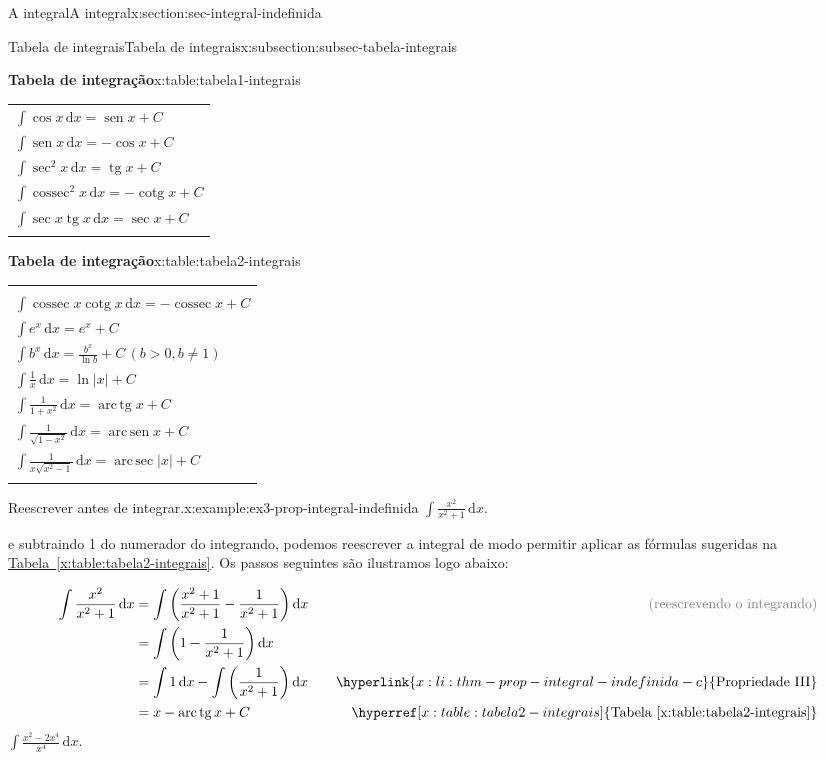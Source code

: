 \documentclass[oneside,10pt,]{article}
\newcommand{\tabularfont}{\relax}
\newcommand{\xreffont}{\relax}
\numberwithin{equation}{section}
\newcommand{\hrulethin}  {\noalign{\hrule height 0.04em}}
\newcommand{\hrulemedium}{\noalign{\hrule height 0.07em}}
\newcommand{\hrulethick} {\noalign{\hrule height 0.11em}}
\newcommand{\dd}{\mathrm{d}}
\newcommand{\integral}[2]{\displaystyle\int {#1}\,\dd {#2}}
\DeclareMathOperator{\arcsec}{arc \,sec}
\DeclareMathOperator{\sin}{sen}
\DeclareMathOperator{\arcsin}{arc \,sen}
\DeclareMathOperator{\csc}{cossec}
\DeclareMathOperator{\tan}{tg}
\DeclareMathOperator{\arctan}{arc\,tg}
\DeclareMathOperator{\cot}{cotg}
\newcommand{\amp}{&}
\begin{document}
\begin{sectionptx}{A integral}{}{A integral}{}{}{x:section:sec-integral-indefinida}
\begin{subsectionptx}{Tabela de integrais}{}{Tabela de integrais}{}{}{x:subsection:subsec-tabela-integrais}
\begin{tableptx}{\textbf{Tabela de integração}}{x:table:tabela1-integrais}{}
{\begin{tabular}{l}
\(\integral{\cos{x}}{x}=\sin{x} + C\)\tabularnewline[0pt]
\(\integral{\sin{x}}{x}=-\cos{x} + C\)\tabularnewline[0pt]
\(\integral{\sec^2{x}}{x}=\tan{x} + C\)\tabularnewline[0pt]
\(\integral{\csc^2{x}}{x}=-\cot{x} + C\)\tabularnewline[0pt]
\(\integral{\sec{x}\tan{x}}{x}=\sec{x} + C\)\tabularnewline\hrulemedium
\end{tabular}
}%
\end{tableptx}%
\begin{tableptx}{\textbf{Tabela de integração}}{x:table:tabela2-integrais}{}%
\centering
{\tabularfont%
\begin{tabular}{l}\hrulethick
\multicolumn{1}{c}{Fórmula}\tabularnewline\hrulethin
\(\integral{\csc{x}\cot{x}}{x}=-\csc{x} + C\)\tabularnewline[0pt]
\(\integral{e^x}{x} = e^x + C\)\tabularnewline[0pt]
\(\integral{b^x}{x}= \frac{b^x}{\ln{b}} + C\, (b>0, b\neq 1)\)\tabularnewline[0pt]
\(\integral{\frac{1}{x}}{x}=\ln{|x|} + C\)\tabularnewline[0pt]
\(\integral{\frac{1}{1+x^2}}{x}=\arctan{x} + C\)\tabularnewline[0pt]
\(\integral{\frac{1}{\sqrt{1-x^2}}}{x}=\arcsin{x} + C\)\tabularnewline[0pt]
\(\integral{\frac{1}{x\sqrt{x^2-1}}}{x}=\arcsec{|x|} + C\)\tabularnewline\hrulemedium
\end{tabular}
}%
\end{tableptx}%
\begin{example}{Reescrever antes de integrar.}{x:example:ex3-prop-integral-indefinida}%
\(\integral{\frac{x^2}{x^2+1}}{x}\).%
\par\smallskip%
\noindentSomando e subtraindo 1 do numerador do integrando, podemos reescrever a integral de modo permitir aplicar as fórmulas sugeridas na \hyperref[x:table:tabela2-integrais]{Tabela~{\xreffont\ref{x:table:tabela2-integrais}}}. Os passos seguintes são ilustramos logo abaixo:%
\par
%
\begin{align*}
\integral{\frac{x^2}{x^2+1}}{x} \amp = \integral{\left(\frac{x^2+1}{x^2+1}-\frac{1}{x^2+1}\right)}{x} \amp \color{gray}{\text{(reescrevendo o integrando)}}\\
\amp =\integral{\left(1-\frac{1}{x^2+1}\right)}{x} \\
\amp = \integral{1}{x} - \integral{\left(\frac{1}{x^2+1}\right)}{x} \quad \amp \hyperlink{x:li:thm-prop-integral-indefinida-c}{\text{Propriedade III}}\\
\amp = x - \arctan{x} + C \quad  \quad \amp \hyperref[x:table:tabela2-integrais]{\text{Tabela {\xreffont\ref{x:table:tabela2-integrais}}}}
\end{align*}
%
 \(\integral{\frac{x^2- 2x^4}{x^4}}{x}\).%

\end{example}
\end{subsectionptx}
\end{sectionptx}
\end{document}

